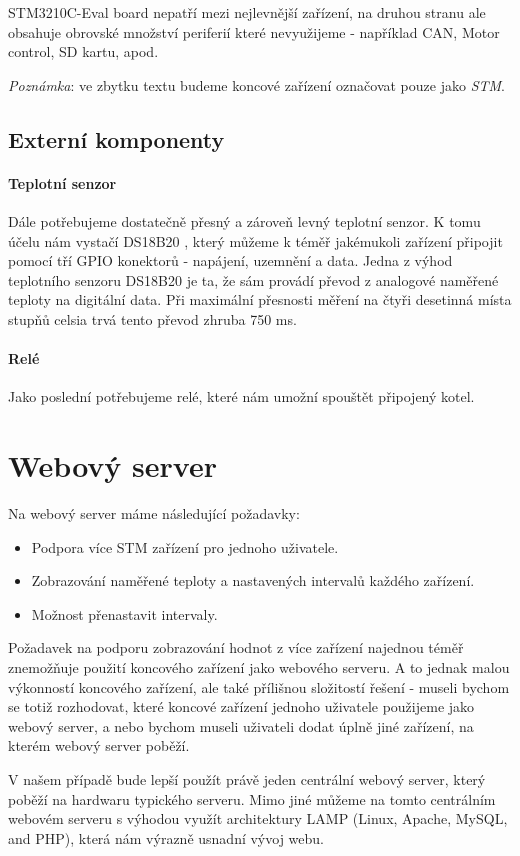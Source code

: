STM3210C-Eval board nepatří mezi nejlevnější zařízení, na druhou stranu ale obsahuje obrovské
množství periferií které nevyužijeme - například CAN, Motor control, SD kartu, apod.

\emph{Poznámka}: ve zbytku textu budeme koncové zařízení označovat pouze jako \emph{STM}.

\subsection{Externí komponenty}
\paragraph{Teplotní senzor}
Dále potřebujeme dostatečně přesný a zároveň levný teplotní senzor.
K tomu účelu nám vystačí DS18B20 \cite{DS18B20}, který můžeme k téměř jakémukoli zařízení připojit pomocí tří
GPIO konektorů - napájení, uzemnění a data.
Jedna z výhod teplotního senzoru DS18B20 je ta, že sám provádí převod z analogové naměřené
teploty na digitální data.
Při maximální přesnosti měření na čtyři desetinná místa stupňů celsia trvá tento převod zhruba
750 ms.

\paragraph{Relé}
Jako poslední potřebujeme relé, které nám umožní spouštět připojený kotel.


\section{Webový server}
Na webový server máme následující požadavky:
\begin{itemize}
  \item Podpora více STM zařízení pro jednoho uživatele.
  \item Zobrazování naměřené teploty a nastavených intervalů každého zařízení.
  \item Možnost přenastavit intervaly.
\end{itemize}

Požadavek na podporu zobrazování hodnot z více zařízení najednou téměř znemožňuje použití koncového
zařízení jako webového serveru.
A to jednak malou výkonností koncového zařízení, ale také přílišnou složitostí řešení - museli bychom
se totiž rozhodovat, které koncové zařízení jednoho uživatele použijeme jako webový server, a nebo bychom
museli uživateli dodat úplně jiné zařízení, na kterém webový server poběží.

V našem případě bude lepší použít právě jeden centrální webový server, který poběží na hardwaru typického
serveru.
Mimo jiné můžeme na tomto centrálním webovém serveru s výhodou využít architektury LAMP (Linux, Apache, MySQL, and PHP),
která nám výrazně usnadní vývoj webu.

